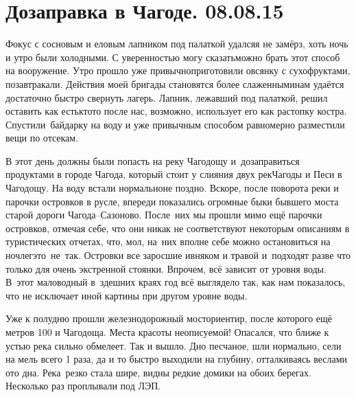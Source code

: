 \chapter{Дозаправка в Чагоде. 08.08.15}

Фокус с сосновым и еловым лапником под палаткой удался\mdash я не замёрз, хоть ночь и утро были холодными. С уверенностью могу сказать\mdash можно брать этот способ на вооружение. Утро прошло уже привычно\mdash приготовили овсянку с сухофруктами, позавтракали. Действия моей бригады становятся более слаженными\mdash нам удаётся достаточно быстро свернуть лагерь. Лапник, лежавший под палаткой, решил оставить как есть\mdash кто\sdash то после нас, возможно, использует его как растопку костра. Спустили~байдарку на воду и уже привычным  способом равномерно разместили вещи по отсекам. 

В этот день должны были попасть на реку Чагодощу и~дозаправиться продуктами в городе Чагода, который стоит у слияния двух рек\mdash Чагоды и Песи в Чагодощу. На воду встали нормально\mdash не поздно. Вскоре, после поворота реки и парочки островков в русле, впереди показались огромные быки бывшего моста старой дороги Чагода\nobreakdash--Сазоново. После~них мы прошли мимо ещё парочки островков, отмечая себе, что они никак не соответствуют некоторым описаниям в туристических отчетах, что, мол, на~них вполне себе можно остановиться на ночлег\mdash это~не~так. Островки все заросшие ивняком и травой и~подходят разве что только для очень экстренной стоянки. Впрочем, всё зависит от уровня воды. В~этот маловодный в~здешних краях год всё выглядело так, как нам показалось, что не исключает иной картины при другом уровне воды. 

Уже к полудню прошли железнодорожный мост\mdash ориентир, после которого ещё метров 100 и Чагодоща. Места красоты неописуемой! Опасался, что ближе к устью река сильно обмелеет. Так и вышло. Дно песчаное, шли нормально, сели на мель всего 1 раза, да и то быстро выходили на глубину, отталкиваясь веслами ото дна. Река~резко стала шире, видны редкие домики на обоих берегах. Несколько раз проплывали под ЛЭП. 

